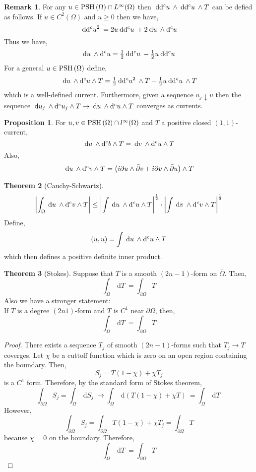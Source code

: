 \documentclass[12pt]{extarticle}
\renewcommand{\d}[1]{\: \mathrm{d}#1 \:}
\theoremstyle{definition}
\newtheorem{theorem}{Theorem}[section]
\newtheorem{proposition}[theorem]{Proposition}
\newtheorem{remark}{Remark}
\begin{document}
\begin{remark}
For any $u \in \mathrm{PSH}\left( \Omega \right) \cap L^\infty(\Omega)$ then $\d{\dc{u}} \wedge \d{\dc{u}} \wedge T$ can be defied as follows. If $u \in C^2(\Omega)$ and $u \ge 0$ then we have,
\[ \d{\dc{u^2}} = 2 u \d{\dc{u}} + 2 \d{u} \wedge \dc{u} \]
Thus we have,
\[ \d{u} \wedge \dc{u} = \tfrac{1}{2} \d{\dc{u}} - \tfrac{1}{2} u \d{\dc{u}} \]
For a general $u \in \mathrm{PSH}\left( \Omega \right)$ define,
\[ \d{u} \wedge \dc{u} \wedge T = \tfrac{1}{2} \d{\dc{u^2}} \wedge T - \tfrac{1}{2} u \d{\dc{u}} \wedge T \]
which is a well-defined current. Furthermore, given a sequence $u_j \downarrow u$ then the sequence $\d{u_j} \wedge \dc{u_j} \wedge T \to \d{u} \wedge \dc{u} \wedge T$ converges as currents. 
\end{remark}

\begin{proposition}
For $u, v \in \mathrm{PSH}\left( \Omega \right) \cap l^\infty(\Omega)$ and $T$ a positive closed $(1,1)$-current,
\[ \d{u} \wedge \dc{b} \wedge T = \d{v} \wedge \dc{u} \wedge T \]
Also,
\[ \d{u} \wedge \dc{v} \wedge T = \left( i \partial u \wedge \bar{\partial} v + i \partial v \wedge \bar{\partial} u \right) \wedge T \]
\end{proposition}

\begin{theorem}[Cauchy-Schwartz]
\[ \left| \int_\Omega \d{u} \wedge \dc{v} \wedge T \right| \le \left| \int \d{u} \wedge \dc{u} \wedge T \right|^{\frac{1}{2}} \cdot \left| \int \d{v} \wedge \dc{v} \wedge T \right|^{\frac{1}{2}} \]
Define,
\[ (u, u) = \int \d{u} \wedge \dc{u} \wedge T \]
which then defines a positive definite inner product. 
\end{theorem}

\begin{theorem}[Stokes]
Suppose that $T$ is a smooth $(2n-1)$-form on $\overline{\Omega}$. Then,
\[ \int_{\Omega} \d{T} = \int_{\partial \Omega} T \]
Also we have a stronger statement:
\bigskip\\
If $T$ is a degree $(2n  1)$-form and $T$ is $C^1$ near $\partial \Omega$, then,
\[ \int_{\Omega} \d{T} = \int_{\partial \Omega} T \]
\end{theorem}

\begin{proof}
There exists a sequence $T_j$ of smooth $(2n - 1)$-forms such that $T_j \to T$ coverges. Let $\chi$ be a cuttoff function which is zero on an open region containing the boundary. Then,
\[ S_j = T(1 - \chi) + \chi T_j \]
is a $C^1$ form. Therefore, by the standard form of Stokes theorem,
\[ \int_{\partial \Omega} S_j = \int_{\Omega} \d{S_j} \to \int_\Omega \d{(T(1 - \chi) + \chi T)} = \int_\Omega \d{T} \]
However,
\[ \int_{\partial \Omega} S_j = \int_{\partial \Omega} T (1 - \chi) + \chi T_j = \int_{\partial \Omega} T \]
because $\chi = 0$ on the boundary. Therefore,
\[ \int_{\Omega} \d{T} = \int_{\partial \Omega} T \]
\end{proof}
\end{document}
